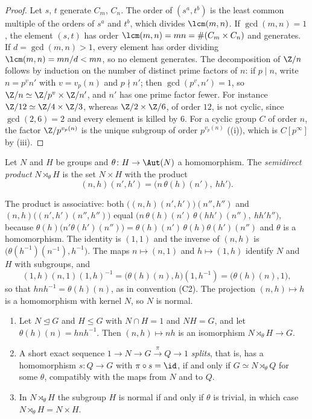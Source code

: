 \begin{proof}
Let $s$, $t$ generate $C_m$, $C_n$. The order of $(s^a,t^b)$ is the least common multiple of the orders of $s^a$ and $t^b$, which divides
$\lcm(m,n)$. If $\gcd(m,n)=1$, the element $(s,t)$ has order $\lcm(m,n)=mn=\#(C_m\times C_n)$ and generates. If $d=\gcd(m,n)>1$, every
element has order dividing $\lcm(m,n)=mn/d<mn$, so no element generates. The decomposition of $\Z/n$ follows by induction on the number
of distinct prime factors of $n$: if $p\mid n$, write $n=p^vn'$ with $v=v_p(n)$ and $p\nmid n'$; then $\gcd(p^v,n')=1$, so $\Z/n\simeq\Z/p^v\times\Z/n'$, and $n'$
has one prime factor fewer. For instance $\Z/12\simeq\Z/4\times\Z/3$, whereas $\Z/2\times\Z/6$, of order $12$, is not cyclic, since $\gcd(2,6)=2$ and every
element is killed by $6$. For a cyclic group $C$ of order $n$, the factor $\Z/p^{v_p(n)}$ is
the unique subgroup of order $p^{v_p(n)}$ ((i)), which is $C[p^\infty]$ by (iii).
\end{proof}

\begin{definition}\label{def:groups:semidirect}
Let $N$ and $H$ be groups and $\theta\colon H\to\Aut(N)$ a homomorphism. The \emph{semidirect product} $N\rtimes_\theta H$ is the set $N\times H$
with the product
\[
(n,h)(n',h')=\bigl(n\,\theta(h)(n'),\ hh'\bigr).
\]
\end{definition}

The product is associative: both $\bigl((n,h)(n',h')\bigr)(n'',h'')$ and $(n,h)\bigl((n',h')(n'',h'')\bigr)$ equal
$\bigl(n\,\theta(h)(n')\,\theta(hh')(n''),\ hh'h''\bigr)$, because $\theta(h)\bigl(n'\theta(h')(n'')\bigr)=\theta(h)(n')\,\theta(h)\theta(h')(n'')$ and $\theta$ is a
homomorphism. The identity is $(1,1)$ and the inverse of $(n,h)$ is $\bigl(\theta(h^{-1})(n^{-1}),h^{-1}\bigr)$. The maps $n\mapsto(n,1)$ and $h\mapsto(1,h)$
identify $N$ and $H$ with subgroups, and
\[
(1,h)(n,1)(1,h)^{-1}=\bigl(\theta(h)(n),h\bigr)(1,h^{-1})=\bigl(\theta(h)(n),1\bigr),
\]
so that $hnh^{-1}=\theta(h)(n)$, as in convention (C2). The projection $(n,h)\mapsto h$ is a homomorphism with kernel $N$, so $N$ is normal.

\begin{proposition}\label{prop:groups:semidirect}
\begin{enumerate}[label=(\roman*)]
\item Let $N\trianglelefteq G$ and $H\le G$ with $N\cap H=1$ and $NH=G$, and let $\theta(h)(n)=hnh^{-1}$. Then $(n,h)\mapsto nh$ is an isomorphism
$N\rtimes_\theta H\to G$.
\item A short exact sequence $1\to N\to G\xrightarrow{\pi}Q\to1$ \emph{splits}, that is, has a homomorphism $s\colon Q\to G$ with $\pi\circ s=\id$, if and only
if $G\simeq N\rtimes_\theta Q$ for some $\theta$, compatibly with the maps from $N$ and to $Q$.
\item In $N\rtimes_\theta H$ the subgroup $H$ is normal if and only if $\theta$ is trivial, in which case $N\rtimes_\theta H=N\times H$.
\end{enumerate}
\end{proposition}

